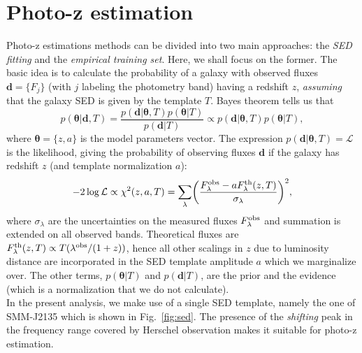 \documentclass[prd,showpacs,amsfonts,amssymb,amsmath, nofootinbib]{revtex4-1}
\def\be{\begin{equation}}
\def\ee{\end{equation}}
\def\be{\begin{equation}}
\def\ee{\end{equation}}
\begin{document}
\section{Photo-z estimation}
\label{sec:photoz}
Photo-z estimations methods can be divided into two main approaches: the \emph{SED fitting} and the \emph{empirical training set}. Here, we shall focus on the former. The basic idea is to calculate the probability of a galaxy with observed fluxes $\mathbf{d}=\{ F_j\}$ (with $j$ labeling the photometry band) having a redshift $z$, \emph{assuming} that the galaxy SED is given by the template $T$. Bayes theorem tells us that
\be
\label{bayes_photoz}
p(\boldsymbol{\theta}| \mathbf{d},T) = \frac{p(\mathbf{d}| \boldsymbol{\theta},T)p(\boldsymbol{\theta}| T)}{p(\mathbf{d}|T)} \propto p(\mathbf{d}| \boldsymbol{\theta},T)p(\boldsymbol{\theta}| T),
\ee
where $\boldsymbol{\theta}=\{z,a\}$ is the model parameters vector. The expression $p(\mathbf{d}| \boldsymbol{\theta},T) = \mathcal{L}$ is the likelihood, giving the probability of observing fluxes $\mathbf{d}$ if the galaxy has redshift $z$ (and template normalization $a$):
\be
\label{like_photoz}
-2\log\mathcal{L} \propto \chi^2(z,a,T) = \sum_{\lambda} \biggl(\frac{F^{\rm obs}_{\lambda}-aF^{\rm th}_{\lambda}(z,T)}{\sigma_{\lambda}} \biggr)^2,
\ee
where $\sigma_{\lambda}$ are the uncertainties on the measured fluxes $F^{\rm obs}_{\lambda}$ and summation is extended on all observed bands. Theoretical fluxes are $F^{\rm th}_{\lambda}(z,T) \propto T(\lambda^{\rm obs}/(1+z))$, hence all other scalings in $z$ due to luminosity distance are incorporated in the SED template amplitude $a$ which we marginalize over. The other terms, $p(\boldsymbol{\theta}| T)$ and $p(\mathbf{d}|T)$, are the prior and the evidence (which is a normalization that we do not calculate). \\
In the present analysis, we make use of a single SED template, namely the one of SMM-J2135 which is shown in Fig.~\ref{fig:sed}. The presence of the \emph{shifting} peak in the frequency range covered by Herschel observation makes it suitable for photo-z estimation.
\end{document}
